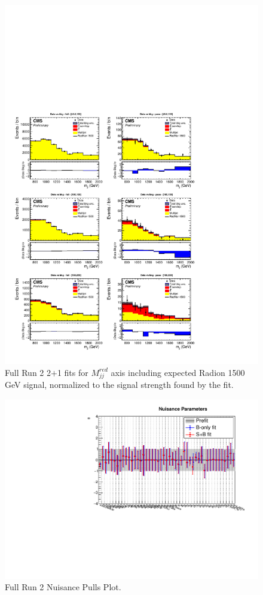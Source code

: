 \begin{figure}[!htb]
	\centering
	\includegraphics[width=1\textwidth]{Figures/postfit_projy_fits_21.pdf}
	\caption{Full Run 2 2$+$1 fits for $M_{jj}^{red}$ axis including expected Radion 1500 GeV signal, normalized to the signal strength found by the fit.}
	\label{fig:21mjj}
\end{figure}
\begin{figure}[!htb]
	\centering
	\includegraphics[width=1\textwidth]{Figures/nuisance_pulls.pdf}
	\caption{Full Run 2 Nuisance Pulls Plot.}
	\label{fig:nuissances}
\end{figure}
